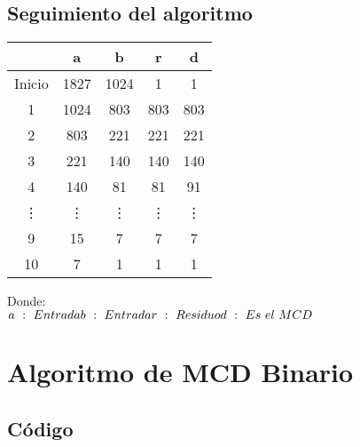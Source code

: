 \documentclass[11pt, conference]{IEEEtran}
\begin{document}
\subsection{Seguimiento del algoritmo}

\begin{center}
\begin{tabular}{|c|c|c|c|c|}
	\hline
	 & \textbf{a}& \textbf{b} & \textbf{r} & \textbf{d} \\	\hline
	Inicio & 1827 & 1024 & 1 & 1\\ \hline
	1 & 1024 & 803 & 803 & 803\\ \hline
	2 & 803 & 221 & 221 & 221\\ \hline
	3 & 221 & 140 & 140 & 140\\ \hline
	4 & 140 & 81 & 81 & 91\\ \hline
	\vdots & \vdots & \vdots & \vdots & \vdots\\ \hline
	9 & 15 & 7 & 7 & 7\\ \hline
	10 & 7 & 1 & 1 & 1\\ \hline
\end{tabular}
\end{center}
Donde:\\
$
	a\ :\ Entrada \\
	b\ :\ Entrada \\
	r\ :\ Residuo \\
	d\ :\ Es\ el\ MCD \\
$
\section{Algoritmo de MCD Binario}
\subsection{Código}
\end{document}
